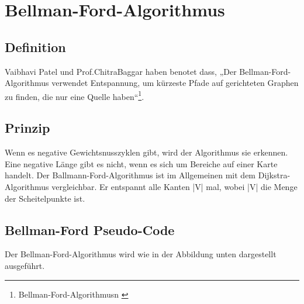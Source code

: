 \section{Bellman-Ford-Algorithmus}
\label{Bellman-Ford-Algorithmus}
\subsection{Definition}

Vaibhavi Patel und Prof.ChitraBaggar haben benotet dass, „Der Bellman-Ford-Algorithmus verwendet Entspannung, um kürzeste Pfade auf gerichteten Graphen zu finden, die nur eine Quelle haben“\footnote{Bellman-Ford-Algorithmusn \cite{Vaibhavi2014}}.
\subsection{Prinzip}
Wenn es negative Gewichtsnusszyklen gibt, wird der Algorithmus sie erkennen. Eine negative Länge gibt es nicht, wenn es sich um Bereiche auf einer Karte handelt. Der Ballmann-Ford-Algorithmus ist im Allgemeinen mit dem Dijkstra-Algorithmus vergleichbar. Er entspannt alle Kanten |V| mal, wobei |V| die Menge der Scheitelpunkte ist\cite{Vaibhavi2014}.

\subsection{Bellman-Ford Pseudo-Code}
Der Bellman-Ford-Algorithmus wird wie in der Abbildung unten dargestellt ausgeführt.



